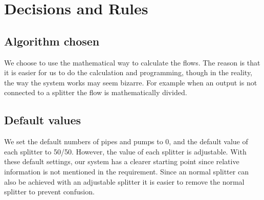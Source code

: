 \chapter{Decisions and Rules}
\section{Algorithm chosen}
\label{sec:algch}	
We choose to use the mathematical way to calculate the flows. The reason is that it is easier for us to do the calculation and programming, though in the reality, the way the system works may seem bizarre. For example when an output is not connected to a splitter the flow is mathematically divided.

\section{Default values}
\label{sec:defv}
We set the default numbers of pipes and pumps to 0, and the default value of each splitter to 50/50. However, the value of each splitter is adjustable. With these default settings, our system has a clearer starting point since relative information is not mentioned in the requirement. Since an normal splitter can also be achieved with an adjustable splitter it is easier to remove the normal splitter to prevent confusion.
